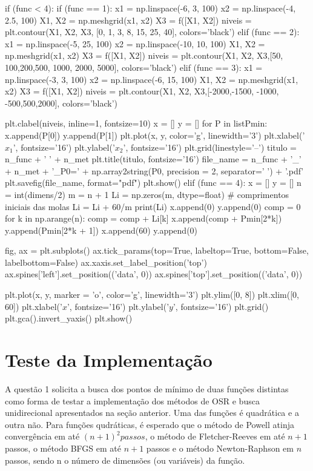 \documentclass[10pt, a4paper]{article}
\begin{document}
\begin{python}
  if (func < 4):
    if (func == 1):
        x1 = np.linspace(-6, 3, 100)
        x2 = np.linspace(-4, 2.5, 100)
        X1, X2 = np.meshgrid(x1, x2)
        X3 = f([X1, X2])
        niveis = plt.contour(X1, X2, X3, [0, 1, 3, 8, 15, 25, 40], colors='black')
    elif (func == 2):
        x1 = np.linspace(-5, 25, 100)
        x2 = np.linspace(-10, 10, 100)
        X1, X2 = np.meshgrid(x1, x2)
        X3 = f([X1, X2])
        niveis = plt.contour(X1, X2, X3,[50, 100,200,500, 1000, 2000, 5000], colors='black')
    elif (func == 3):
        x1 = np.linspace(-3, 3, 100)
        x2 = np.linspace(-6, 15, 100)
        X1, X2 = np.meshgrid(x1, x2)
        X3 = f([X1, X2])
        niveis = plt.contour(X1, X2, X3,[-2000,-1500, -1000, -500,500,2000], colors='black')
        
    plt.clabel(niveis, inline=1, fontsize=10)
    x = []
    y = []
    for P in listPmin:
        x.append(P[0])
        y.append(P[1])
    plt.plot(x, y, color='g', linewidth='3')
    plt.xlabel('$x_1$', fontsize='16')
    plt.ylabel('$x_2$', fontsize='16')
    plt.grid(linestyle='--')
    titulo = n_func + ' ' + n_met
    plt.title(titulo, fontsize='16')
    file_name = n_func + '_' + n_met + '_P0=' + np.array2string(P0, precision = 2, separator=' ') + '.pdf'
    plt.savefig(file_name, format="pdf")
    plt.show()
  elif (func == 4):
      x = []
      y = []
      n = int(dimens/2)
      m = n + 1
      Li = np.zeros(m, dtype=float) # comprimentos iniciais das molas
      Li = Li + 60/m
      print(Li)
      x.append(0)
      y.append(0)
      comp = 0
      for k in np.arange(n):
          comp = comp + Li[k]
          x.append(comp + Pmin[2*k])
          y.append(Pmin[2*k + 1])
      x.append(60)
      y.append(0)
      
      fig, ax = plt.subplots()
      ax.tick_params(top=True, labeltop=True, bottom=False, labelbottom=False)
      ax.xaxis.set_label_position('top')
      ax.spines['left'].set_position(('data', 0))
      ax.spines['top'].set_position(('data', 0))

          
      plt.plot(x, y, marker = 'o', color='g', linewidth='3')
      plt.ylim([0, 8])
      plt.xlim([0, 60])
      plt.xlabel('$x$', fontsize='16')
      plt.ylabel('$y$', fontsize='16')
      plt.grid()
      plt.gca().invert_yaxis()
      plt.show()
\end{python}

\section{Teste da Implementação}
A questão 1 solicita a busca dos pontos de mínimo de duas funções distintas como forma de testar a implementação dos métodos de OSR e busca unidirecional apresentados na seção anterior.
Uma das funções é quadrática e a outra não. Para funções qudráticas, é esperado que o método de Powell atinja convergência em até $(n + 1)^2 passos$, o método de Fletcher-Reeves em até $n + 1$ passos,
o método BFGS em até $n + 1$ passos e o método Newton-Raphson em $n$ passos, sendo n o número de dimensões (ou variáveis) da função.
\end{document}
